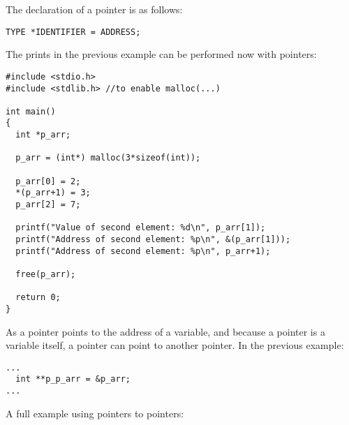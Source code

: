 \documentclass[11pt]{article}
\begin{document}
The declaration of a pointer is as follows:

\begin{lstlisting}[numbers=none]
TYPE *IDENTIFIER = ADDRESS;
\end{lstlisting}

The prints in the previous example can be performed now with pointers:

\begin{lstlisting}
#include <stdio.h>
#include <stdlib.h> //to enable malloc(...)

int main()
{
  int *p_arr;

  p_arr = (int*) malloc(3*sizeof(int));

  p_arr[0] = 2;
  *(p_arr+1) = 3;
  p_arr[2] = 7;

  printf("Value of second element: %d\n", p_arr[1]);
  printf("Address of second element: %p\n", &(p_arr[1]));
  printf("Address of second element: %p\n", p_arr+1);

  free(p_arr);

  return 0;
}
\end{lstlisting}


As a pointer points to the address of a variable, and because a pointer is a variable itself, a pointer can point to another pointer. In the previous example:

\begin{lstlisting}[numbers=none]
...
  int **p_p_arr = &p_arr;
...
\end{lstlisting}

A full example using pointers to pointers:
\end{document}
